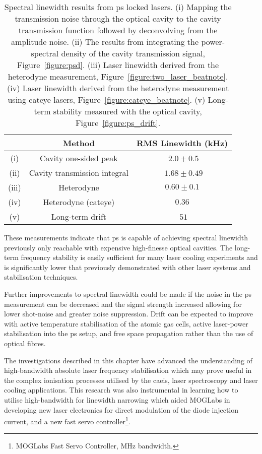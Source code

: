 \begin{table}
\centering
\begin{tabular}{c c c}
\\
\hline
        & Method                       & RMS Linewidth (kHz) \\ \hline
  (i)   & Cavity one-sided peak        & \,\,$2.0 \pm 0.5$   \\
  (ii)  & Cavity transmission integral & \,\,$1.68 \pm 0.49$ \\
  (iii) & Heterodyne                   & $0.60\pm0.1$        \\
  (iv)  & Heterodyne (cateye)          & $0.36$              \\
  (v)   & Long-term drift              & \,\,$51$            \\ \hline\end{tabular}

\caption{Spectral linewidth results from \gls{ps} locked lasers.
(i) Mapping the transmission noise through the optical cavity to the cavity transmission function followed by deconvolving from the amplitude noise.
(ii) The results from integrating the power-spectral density of the cavity transmission signal, Figure~\ref{figure:psd}.
(iii) Laser linewidth derived from the heterodyne measurement, Figure~\ref{figure:two_laser_beatnote}.
(iv) Laser linewidth derived from the heterodyne measurement using cateye lasers, Figure~\ref{figure:cateye_beatnote}.
(v) Long-term stability measured with the optical cavity, Figure~\ref{figure:ps_drift}.}
\label{table:linewidths}
\end{table}

These measurements indicate that \gls{ps} is capable of achieving spectral linewidth previously only reachable with expensive high-finesse optical cavities.
The long-term frequency stability is easily sufficient for many laser cooling experiments and is significantly lower that previously demonstrated with other laser systems and stabilisation techniques.

Further improvements to spectral linewidth could be made if the noise in the \gls{ps} measurement can be decreased and the signal strength increased allowing for lower shot-noise and greater noise suppression.
Drift can be expected to improve with active temperature stabilisation of the atomic gas cells, active laser-power stabilisation into the \gls{ps} setup, and free space propagation rather than the use of optical fibres.

The investigations described in this chapter have advanced the understanding of high-bandwidth absolute laser frequency stabilisation which may prove useful in the complex ionisation processes utilised by the \gls{caeis}, laser spectroscopy and laser cooling applications.
This research was also instrumental in learning how to utilise high-bandwidth for linewidth narrowing which aided MOGLabs in developing new laser electronics for direct modulation of the diode injection current, and a new fast servo controller\footnote{MOGLabs Fast Servo Controller, \unit[40]{MHz} bandwidth.}.
